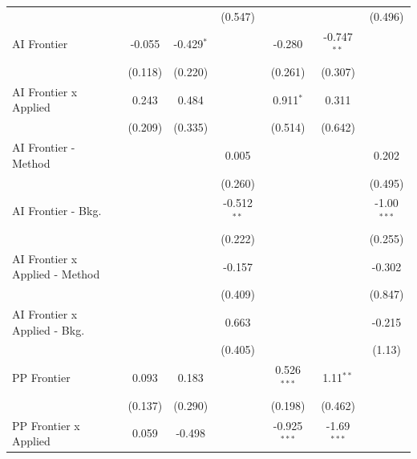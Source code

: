 \begin{tabular}{lcccccc}
                                  &               &               & (0.547)       &                &               & (0.496)\\   
   AI Frontier                    & -0.055        & -0.429$^{*}$  &               & -0.280         & -0.747$^{**}$ &   \\   
                                  & (0.118)       & (0.220)       &               & (0.261)        & (0.307)       &   \\   
   AI Frontier x Applied          & 0.243         & 0.484         &               & 0.911$^{*}$    & 0.311         &   \\   
                                  & (0.209)       & (0.335)       &               & (0.514)        & (0.642)       &   \\   
   AI Frontier - Method           &               &               & 0.005         &                &               & 0.202\\   
                                  &               &               & (0.260)       &                &               & (0.495)\\   
   AI Frontier - Bkg.             &               &               & -0.512$^{**}$ &                &               & -1.00$^{***}$\\   
                                  &               &               & (0.222)       &                &               & (0.255)\\   
   AI Frontier x Applied - Method &               &               & -0.157        &                &               & -0.302\\   
                                  &               &               & (0.409)       &                &               & (0.847)\\   
   AI Frontier x Applied - Bkg.   &               &               & 0.663         &                &               & -0.215\\   
                                  &               &               & (0.405)       &                &               & (1.13)\\   
   PP Frontier                    & 0.093         & 0.183         &               & 0.526$^{***}$  & 1.11$^{**}$   &   \\   
                                  & (0.137)       & (0.290)       &               & (0.198)        & (0.462)       &   \\   
   PP Frontier x Applied          & 0.059         & -0.498        &               & -0.925$^{***}$ & -1.69$^{***}$ &   \\   

\end{tabular}
